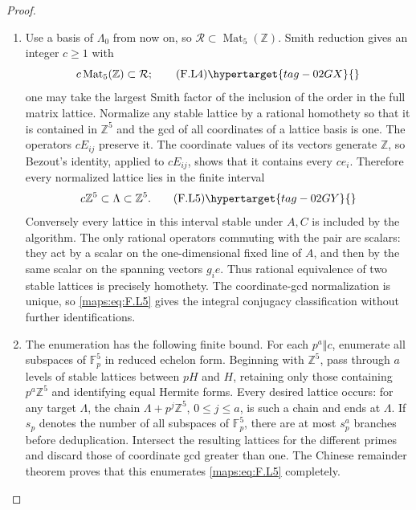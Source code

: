 \begin{proof}
\begin{enumerate}[label={$\langle1\rangle$\arabic*.}]
\item Use a basis of $\Lambda_0$ from now on, so
$\mathcal R\subset\operatorname{Mat}_5(\mathbb Z)$.
Smith reduction gives an integer $c\ge1$ with
\[
 c\operatorname{Mat}_5(\mathbb Z)\subset\mathcal R;
 \tag{F.L4}\hypertarget{tag-02GX}{}\label{maps:eq:F.L4}
\]
one may take the largest Smith factor of the inclusion
of the order in the full matrix lattice.
Normalize any stable lattice by a rational homothety so
that it is contained in $\mathbb Z^5$ and the gcd of all
coordinates of a lattice basis is one.
The operators $cE_{ij}$ preserve it.  The coordinate values
of its vectors generate $\mathbb Z$, so Bezout's identity,
applied to $cE_{ij}$, shows that it contains every $ce_i$.
Therefore every normalized lattice lies in the finite interval
\[
 c\mathbb Z^5\subset\Lambda\subset\mathbb Z^5.
 \tag{F.L5}\hypertarget{tag-02GY}{}\label{maps:eq:F.L5}
\]
Conversely every lattice in this interval stable under
$A,C$ is included by the algorithm.
The only rational operators commuting with the pair are
scalars: they act by a scalar on the one-dimensional fixed
line of $A$, and then by the same scalar on the spanning
vectors $g_ie$.  Thus rational equivalence of two stable
lattices is precisely homothety.  The coordinate-gcd
normalization is unique, so \eqref{maps:eq:F.L5} gives the integral
conjugacy classification without further identifications.

\item The enumeration has the following finite bound.
For each $p^a\Vert c$, enumerate all subspaces of
$\mathbb F_p^5$ in reduced echelon form.
Beginning with $\mathbb Z^5$, pass through $a$ levels of
stable lattices between $pH$ and $H$, retaining only those
containing $p^a\mathbb Z^5$ and identifying equal Hermite
forms.  Every desired lattice occurs: for any target
$\Lambda$, the chain
$\Lambda+p^j\mathbb Z^5$, $0\le j\le a$, is such a
chain and ends at $\Lambda$.
If $s_p$ denotes the number of all subspaces of
$\mathbb F_p^5$, there are at most $s_p^a$ branches before
deduplication.  Intersect the resulting lattices for the
different primes and discard those of coordinate gcd
greater than one.  The Chinese remainder theorem proves
that this enumerates \eqref{maps:eq:F.L5} completely.


\end{enumerate}
\end{proof}
